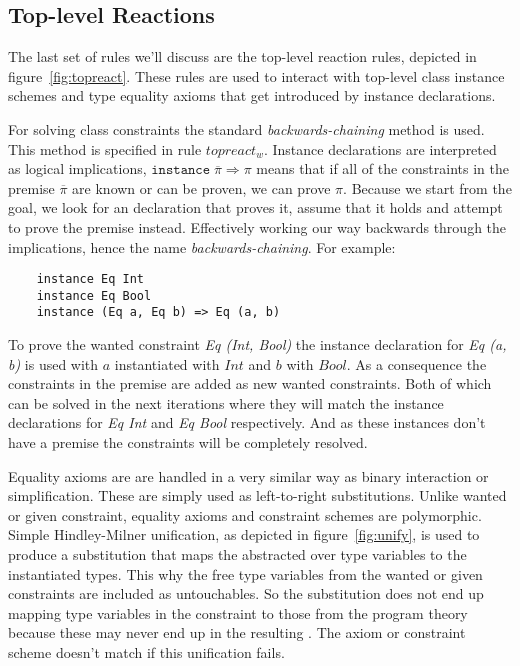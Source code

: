 \subsection{Top-level Reactions}
The last set of rules we'll discuss are the top-level reaction rules, depicted
in figure~\ref{fig:topreact}. These rules are used to interact with top-level
class instance schemes and type equality axioms that get introduced by instance
declarations.

For solving class constraints the standard \textit{backwards-chaining} method is
used. This method is specified in rule $topreact_w$. Instance declarations
are interpreted as logical implications, $\texttt{instance} \; \overline{\pi}
\Rightarrow \pi$ means that if all of the constraints in the premise
$\overline{\pi}$ are known or can be proven, we can prove $\pi$. Because we
start from the goal, we look for an declaration that proves it, assume that it
holds and attempt to prove the premise instead. Effectively working our way
backwards through the implications, hence the name \textit{backwards-chaining}.
For example:
\begin{verbatim}
    instance Eq Int
    instance Eq Bool
    instance (Eq a, Eq b) => Eq (a, b)
\end{verbatim}
To prove the wanted constraint \textit{Eq (Int, Bool)} the instance declaration
for \textit{Eq (a, b)} is used with $a$ instantiated with $Int$ and $b$ with
$Bool$. As a consequence the constraints in the premise are added as new wanted
constraints. Both of which can be solved in the next iterations where they will
match the instance declarations for \textit{Eq Int} and \textit{Eq Bool}
respectively. And as these instances don't have a premise the constraints will
be completely resolved.

Equality axioms are are handled in a very similar way as binary interaction or
simplification. These are simply used as left-to-right substitutions. Unlike
wanted or given constraint, equality axioms and constraint schemes are
polymorphic. Simple Hindley-Milner unification, as depicted in
figure~\ref{fig:unify}, is used to produce a substitution that maps the
abstracted over type variables to the instantiated types. This why the free type
variables from the wanted or given constraints are included as untouchables. So
the substitution does not end up mapping type variables in the constraint to
those from the program theory because these may never end up in the resulting
\systemfc. The axiom or constraint scheme doesn't match if this
unification fails.

